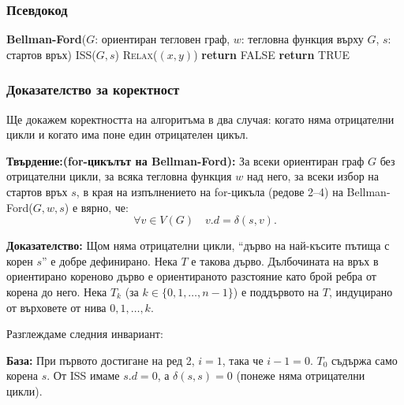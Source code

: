 \documentclass{article}
\renewcommand{\\}{\newline}
\newcommand{\tv}{\textbf{Твърдение:\;}}
\newcommand{\doc}{\textbf{Доказателство: }}
\begin{document}
\subsubsection{Псевдокод}

\begin{algorithmic}[1]
\State \textbf{Bellman-Ford}(\(G\): ориентиран тегловен граф, \(w\): тегловна функция върху \(G\), \(s\): стартов връх)
\State \textsc{ISS}(\(G, s\))
        \State \textsc{Relax}(\((x, y)\))
    \EndFor
\EndFor
{}
        \State \textbf{return} FALSE
    \EndIf
\EndFor
\State \textbf{return} TRUE
\end{algorithmic}

\subsubsection{Доказателство за коректност}

Ще докажем коректността на алгоритъма в два случая: когато няма отрицателни цикли и когато има поне един отрицателен цикъл.

\tv \textbf{(for-цикълът на Bellman-Ford):}
За всеки ориентиран граф \(G\) без отрицателни цикли, за всяка тегловна функция \(w\) над него, за всеки избор на стартов връх \(s\), в края на изпълнението на for-цикъла (редове 2–4) на Bellman-Ford(\(G, w, s\)) е вярно, че:
\[
\forall v \in V(G) \quad v.d = \delta(s, v).
\]

\doc
Щом няма отрицателни цикли, ``дърво на най-късите пътища с корен \(s\)'' е добре дефинирано. Нека \(T\) е такова дърво. Дълбочината на връх в ориентирано кореново дърво е ориентираното разстояние като брой ребра от корена до него. Нека \(T_k\) (за \(k \in \{0,1,\dots,n-1\}\)) е поддървото на \(T\), индуцирано от върховете от нива \(0,1,\dots,k\).

Разглеждаме следния инвариант:

\begin{center}
\end{center}

\noindent \textbf{База:} При първото достигане на ред 2, \(i = 1\), така че \(i-1 = 0\). \(T_0\) съдържа само корена \(s\). От ISS имаме \(s.d = 0\), а \(\delta(s, s) = 0\) (понеже няма отрицателни цикли).
\end{document}
